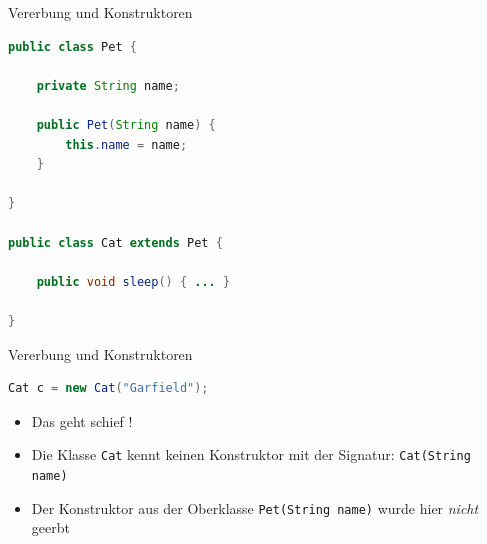 \documentclass[18pt]{beamer}
\begin{document}
\begin{frame}[fragile]{Vererbung und Konstruktoren}
    \begin{exampleblock}{}
        \begin{lstlisting}[language=Java,basicstyle=\scriptsize]
public class Pet {

    private String name;

    public Pet(String name) {
        this.name = name;
    }

}

public class Cat extends Pet {

    public void sleep() { ... }

}
        \end{lstlisting}

    \end{exampleblock}
\end{frame}

\begin{frame}[fragile]{Vererbung und Konstruktoren}
    \begin{exampleblock}{}
        \begin{lstlisting}[language=Java,basicstyle=\scriptsize]
Cat c = new Cat("Garfield");
        \end{lstlisting}

    \end{exampleblock}

    \begin{itemize}
        \item Das geht schief !
        \item Die Klasse \texttt{Cat} kennt keinen Konstruktor mit der Signatur: \texttt{Cat(String name)}
        \item Der Konstruktor aus der Oberklasse \texttt{Pet(String name)} wurde hier \textit{nicht} geerbt
    \end{itemize}
\end{frame}
\end{document}
